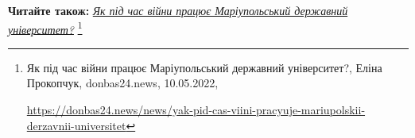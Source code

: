  
 
 
 
 

\textbf{Читайте також:} \href{https://donbas24.news/news/yak-pid-cas-viini-pracyuje-mariupolskii-derzavnii-universitet}{\emph{Як під час війни працює Маріупольський державний університет?}}%
\footnote{Як під час війни працює Маріупольський державний університет?, Еліна Прокопчук, donbas24.news, 10.05.2022, \par%
\url{https://donbas24.news/news/yak-pid-cas-viini-pracyuje-mariupolskii-derzavnii-universitet}%
}
